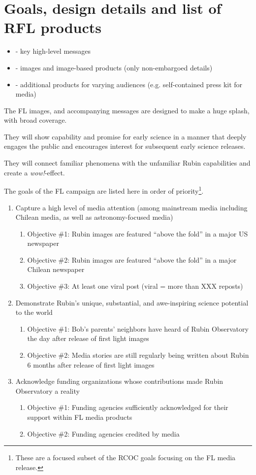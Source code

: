 \section{Goals, design details and list of RFL products} \label{sec:goals}

\begin{itemize}
\item  - key high-level messages
\item - images and image-based products (only non-embargoed details)
\item - additional products for varying audiences (e.g. self-contained press kit for media)
\end{itemize}

The FL images, and accompanying messages are designed to make a huge splash, with broad coverage.

They will show capability and promise for early science in a manner that deeply engages the public and encourages interest for subsequent early science releases.

They will connect familiar phenomena with the unfamiliar Rubin capabilities and create a \emph{wow!}-effect.

The goals of the FL campaign are listed here in order of priority\footnote{ These are a focused subset of the RCOC goals focusing on the FL media release. }.


\begin{enumerate}
\item Capture a high level of media attention (among mainstream media including Chilean media, as well as astronomy-focused media)
\begin{enumerate}
\item Objective \#1: Rubin images are featured “above the fold” in a major US newspaper
\item Objective \#2: Rubin images are featured “above the fold” in a major Chilean newspaper
\item Objective \#3: At least one viral post (viral = more than XXX reposts)
\end{enumerate}
\item Demonstrate Rubin's unique, substantial, and awe-inspiring science potential to the world
\begin{enumerate}
\item Objective \#1: Bob’s parents’ neighbors have heard of Rubin Observatory the day after release of first light images
\item Objective \#2: Media stories are still regularly being written about Rubin 6 months after release of first light images
\end{enumerate}
\item Acknowledge funding organizations whose contributions made Rubin Observatory a reality
\begin{enumerate}
\item Objective \#1: Funding agencies sufficiently acknowledged for their support within FL media products
\item Objective \#2: Funding agencies credited by media
\end{enumerate}

\end{enumerate}


